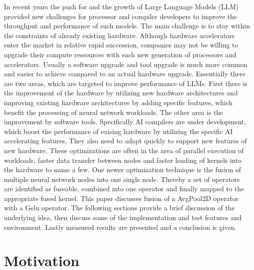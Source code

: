 \documentclass[letterpaper]{article}
\begin{document}
In recent years the push for and the growth of Large Language Models (LLM) provided new challenges for processor and compiler developers to improve the throughput and performance of such models. The main challenge is to stay within the constraints of already existing hardware. Although hardware accelerators enter the market in relative rapid succession, companies may not be willing to upgrade their compute ressources with each new generation of processors and accelerators. Usually a software upgrade and tool upgrade is much more common and easier to achieve compared to an actual hardware upgrade.  
Essentially there are two areas, which are targeted to improve performance of LLMs. First there is the improvement of the hardware by utilizing new hardware architectures and improving existing hardware architectures by adding specific features, which benefit the processing of neural network workloads. The other area is the improvement by software tools. Specifically AI compilers are under development, which boost the performance of exising hardware by utilizing the specific AI accelerating features. They also need to adapt quickly to support new features of new hardware. These optimizations are often in the area of parallel execution of workloads, faster data transfer between nodes and faster loading of kernels into the hardware to name a few. 
One newer optimization technique is the fusion of multiple neural network nodes into one single node. Thereby a set of operators are identified as fuseable, combined into one operator and finally mapped to the appropriate fused kernel. This paper discusses fusion of a AvgPool2D operator with a Gelu operator. The following sections provide a brief discussion of the underlying idea, then discuss some of the implementation and test features and environment. Lastly measured results are presented and a conclusion is given. 

\section{Motivation} 
\end{document}
